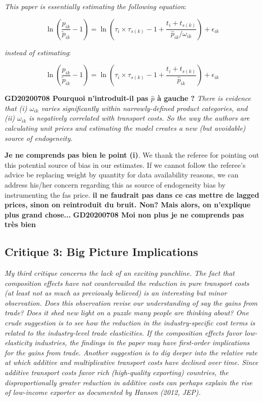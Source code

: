 \documentclass[a4paper,12pt]{article}
\begin{document}
\textit{This paper is essentially estimating the following equation}:

\begin{equation*}
\ln\left(\frac{p_{ik}}{\widetilde{p}_{ik}}-1 \right)= \ln \left(\tau_{i} \times \tau_{s(k)} -1 +\frac{t_{i} + t_{s(k)}}{\widehat{p}_{ik}/\omega_{ik}} \right) + \epsilon_{ik}
\end{equation*}

\textit{instead of estimating}:


\begin{equation*}
\ln\left(\frac{p_{ik}}{\widetilde{p}_{ik}}-1 \right)= \ln \left(\tau_{i} \times \tau_{s(k)}-1 +\frac{t_{i} + t_{s(k)}}{\widehat{p}_{ik}} \right) + \epsilon_{ik}
\end{equation*}

\textbf{GD20200708 Pourquoi n’introduit-il pas $\widehat{p}$ à gauche ?}
\textit{There is evidence that (i) $\omega_{ik}$ varies significantly within narrowly-defined product
categories, and (ii) $\omega_{ik}$ is negatively correlated with transport costs. So the
way the authors are calculating unit prices and estimating the model creates a
new (but avoidable) source of endogeneity.}


\textbf{Je ne comprends pas bien le point (i)}. We thank the referee for pointing out this potential source of bias in our estimates. If we cannot follow the referee's advice be replacing weight by quantity for data availability reasons, we can address his/her concern regarding this as source of endogeneity bias by instrumenting the fas price. \textbf{il ne faudrait pas dans ce cas mettre de lagged prices, sinon on reintroduit du bruit. Non? Mais alors, on n'explique plus grand chose... }
\textbf{GD20200708 Moi non plus je ne comprends pas très bien}

\subsection{Critique 3: Big Picture Implications}

\textit{My third critique concerns the lack of an exciting punchline. The fact that
composition effects have not countervailed the reduction in pure transport costs
(at least not as much as previously believed) is an interesting but minor observation.
Does this observation revise our understanding of say the gains from
trade? Does it shed new light on a puzzle many people are thinking about?
One crude suggestion is to see how the reduction in the industry-specific cost
terms is related to the industry-level trade elasticities. If the composition effects
favor low-elasticity industries, the findings in the paper may have first-order
implications for the gains from trade.
Another suggestion is to dig deeper into the relative rate at which additive
and multiplicative transport costs have declined over time. Since additive transport
costs favor rich (high-quality exporting) countries, the disproportionally
greater reduction in additive costs can perhaps explain the rise of low-income
exporter as documented by Hanson (2012, JEP).}
\end{document}
